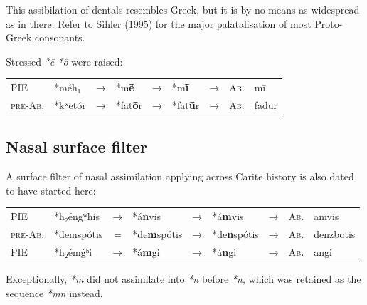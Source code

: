 \documentclass[svgnames,x11names,b5paper]{book}
\begin{document}
            This assibilation of dentals resembles Greek, but it is by no means as widespread as in there. Refer to Sihler (1995) for the major palatalisation of most Proto-Greek consonants.

        Stressed \textit{*ē *ō} were raised:

            \begin{table}[H]
                \begin{center}
                \begin{tabular}{llcllllll}
                \textsc{PIE} & *méh₁ & → & *m\textbf{ē}́ & → & *m\textbf{ī}́ & → & \textsc{Ab.} & mī\\
                \textsc{pre-Ab.} & *kʷetṓr & → & *fat\textbf{ō}́r & → & *fat\textbf{ū}́r & → & \textsc{Ab.} & fadūr\\
                \end{tabular}
                \end{center}
                \end{table}
        
            \subsection{Nasal surface filter}
        
        A surface filter of nasal assimilation applying across Carite history is also dated to have started here:

            \begin{table}[H]
                \begin{center}
                \begin{tabular}{llcllllll}
                \textsc{PIE} & *h₂éngʷhis & → & *á\textbf{n}vis & → & *á\textbf{m}vis & → & \textsc{Ab.} & amvis\\
                \textsc{pre-Ab.} & *demspótis & = & *de\textbf{m}spótis & → & *de\textbf{n}spótis & → & \textsc{Ab.} & denzbotis\\
                \textsc{PIE} & *h₂émǵʰi & → & *á\textbf{m}gi & → & *á\textbf{n}gi & → & \textsc{Ab.} & angi\\
                \end{tabular}
                \end{center}
                \end{table}
        
            Exceptionally, \textit{*m} did not assimilate into \textit{*n} before \textit{*n}, which was retained as the sequence \textit{*mn} instead.
\end{document}
